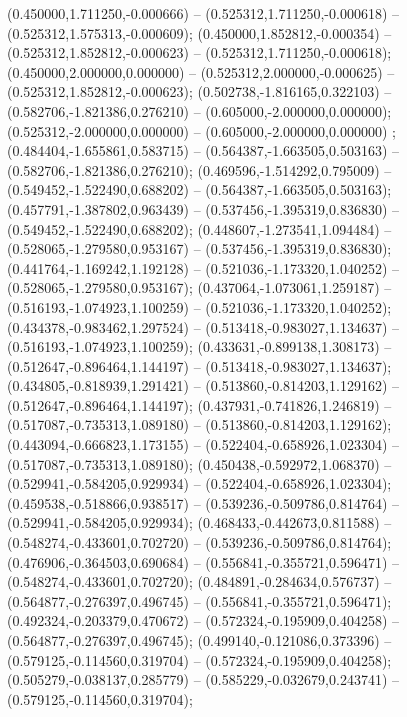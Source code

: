  (0.450000,1.711250,-0.000666) -- (0.525312,1.711250,-0.000618) -- (0.525312,1.575313,-0.000609);
 (0.450000,1.852812,-0.000354) -- (0.525312,1.852812,-0.000623) -- (0.525312,1.711250,-0.000618);
 (0.450000,2.000000,0.000000) -- (0.525312,2.000000,-0.000625) -- (0.525312,1.852812,-0.000623);
 (0.502738,-1.816165,0.322103) -- (0.582706,-1.821386,0.276210) -- (0.605000,-2.000000,0.000000);
 (0.525312,-2.000000,0.000000) -- (0.605000,-2.000000,0.000000) ;
 (0.484404,-1.655861,0.583715) -- (0.564387,-1.663505,0.503163) -- (0.582706,-1.821386,0.276210);
 (0.469596,-1.514292,0.795009) -- (0.549452,-1.522490,0.688202) -- (0.564387,-1.663505,0.503163);
 (0.457791,-1.387802,0.963439) -- (0.537456,-1.395319,0.836830) -- (0.549452,-1.522490,0.688202);
 (0.448607,-1.273541,1.094484) -- (0.528065,-1.279580,0.953167) -- (0.537456,-1.395319,0.836830);
 (0.441764,-1.169242,1.192128) -- (0.521036,-1.173320,1.040252) -- (0.528065,-1.279580,0.953167);
 (0.437064,-1.073061,1.259187) -- (0.516193,-1.074923,1.100259) -- (0.521036,-1.173320,1.040252);
 (0.434378,-0.983462,1.297524) -- (0.513418,-0.983027,1.134637) -- (0.516193,-1.074923,1.100259);
 (0.433631,-0.899138,1.308173) -- (0.512647,-0.896464,1.144197) -- (0.513418,-0.983027,1.134637);
 (0.434805,-0.818939,1.291421) -- (0.513860,-0.814203,1.129162) -- (0.512647,-0.896464,1.144197);
 (0.437931,-0.741826,1.246819) -- (0.517087,-0.735313,1.089180) -- (0.513860,-0.814203,1.129162);
 (0.443094,-0.666823,1.173155) -- (0.522404,-0.658926,1.023304) -- (0.517087,-0.735313,1.089180);
 (0.450438,-0.592972,1.068370) -- (0.529941,-0.584205,0.929934) -- (0.522404,-0.658926,1.023304);
 (0.459538,-0.518866,0.938517) -- (0.539236,-0.509786,0.814764) -- (0.529941,-0.584205,0.929934);
 (0.468433,-0.442673,0.811588) -- (0.548274,-0.433601,0.702720) -- (0.539236,-0.509786,0.814764);
 (0.476906,-0.364503,0.690684) -- (0.556841,-0.355721,0.596471) -- (0.548274,-0.433601,0.702720);
 (0.484891,-0.284634,0.576737) -- (0.564877,-0.276397,0.496745) -- (0.556841,-0.355721,0.596471);
 (0.492324,-0.203379,0.470672) -- (0.572324,-0.195909,0.404258) -- (0.564877,-0.276397,0.496745);
 (0.499140,-0.121086,0.373396) -- (0.579125,-0.114560,0.319704) -- (0.572324,-0.195909,0.404258);
 (0.505279,-0.038137,0.285779) -- (0.585229,-0.032679,0.243741) -- (0.579125,-0.114560,0.319704);
